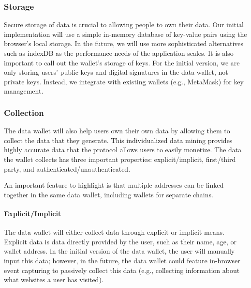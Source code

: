 \subsubsection{Storage}
Secure storage of data is crucial to allowing people to own their data. Our initial implementation will use a simple in-memory database of key-value pairs using the browser's local storage. In the future, we will use more sophisticated alternatives such as indexDB as the performance needs of the application scales. It is also important to call out the wallet's storage of keys. For the initial version, we are only storing users' public keys and digital signatures in the data wallet, not private keys. Instead, we integrate with existing wallets (e.g., MetaMask) for key management.


\subsubsection{Collection}
The data wallet will also help users own their own data by allowing them to collect the data that they generate. This individualized data mining provides highly accurate data that the protocol allows users to easily monetize. The data the wallet collects has three important properties: explicit/implicit, first/third party, and authenticated/unauthenticated. %

An important feature to highlight is that multiple addresses can be linked together in the same data wallet, including wallets for separate chains. %

\paragraph{Explicit/Implicit}
The data wallet will either collect data through explicit or implicit means. Explicit data is data directly provided by the user, such as their name, age, or wallet address. In the initial version of the data wallet, the user will manually input this data; however, in the future, the data wallet could feature in-browser event capturing to passively collect this data (e.g., collecting information about what websites a user has visited).



